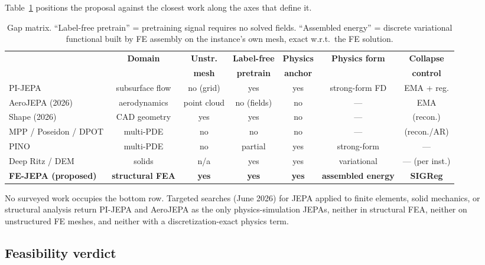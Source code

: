 \documentclass[11pt]{article}
\begin{document}
Table~\ref{tab:gap} positions the proposal against the closest work along the
axes that define it.

\begin{table}[h]
\centering
\footnotesize
\setlength{\tabcolsep}{3.5pt}
\begin{tabular}{@{}p{3.0cm}cccccc@{}}
\toprule
 & \textbf{Domain} & \textbf{Unstr.} & \textbf{Label-free} & \textbf{Physics} & \textbf{Physics form} & \textbf{Collapse}\\
 & & \textbf{mesh} & \textbf{pretrain} & \textbf{anchor} & & \textbf{control}\\
\midrule
PI-JEPA \cite{yee2026pijepa} & subsurface flow & no (grid) & yes & yes & strong-form FD & EMA + reg.\\
AeroJEPA (2026) & aerodynamics & point cloud & no (fields) & no & --- & EMA\\
Shape (2026) & CAD geometry & yes & yes & no & --- & (recon.)\\
MPP / Poseidon / DPOT & multi-PDE & no & no & no & --- & (recon./AR)\\
PINO \cite{li2024pino} & multi-PDE & no & partial & yes & strong-form & ---\\
Deep Ritz / DEM \cite{e2018ritz,samaniego2020} & solids & n/a & yes & yes & variational & --- (per inst.)\\
\textbf{FE-JEPA (proposed)} & \textbf{structural FEA} & \textbf{yes} & \textbf{yes} & \textbf{yes} & \textbf{assembled energy} & \textbf{SIGReg}\\
\bottomrule
\end{tabular}
\caption{Gap matrix. ``Label-free pretrain'' = pretraining signal requires no
solved fields. ``Assembled energy'' = discrete variational functional built by
FE assembly on the instance's own mesh, exact w.r.t.\ the FE solution.}
\label{tab:gap}
\end{table}

No surveyed work occupies the bottom row. Targeted searches (June 2026) for
JEPA applied to finite elements, solid mechanics, or structural analysis
return PI-JEPA and AeroJEPA as the only physics-simulation JEPAs, neither in
structural FEA, neither on unstructured FE meshes, and neither with a
discretization-exact physics term.

\subsection{Feasibility verdict}
\end{document}
